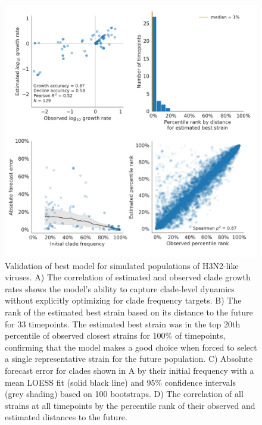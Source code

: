 \begin{figure}[H]
  \begin{center}
  \includegraphics[width=\textwidth]{figures/validation-of-best-model-for-simulated-populations.png}
  \caption{
  Validation of best model for simulated populations of H3N2-like viruses.
  A) The correlation of estimated and observed clade growth rates shows the model's ability to capture clade-level dynamics without explicitly optimizing for clade frequency targets.
  B) The rank of the estimated best strain based on its distance to the future for 33 timepoints.
  The estimated best strain was in the top 20th percentile of observed closest strains for 100\% of timepoints, confirming that the model makes a good choice when forced to select a single representative strain for the future population.
  C) Absolute forecast error for clades shown in A by their initial frequency with a mean LOESS fit (solid black line) and 95\% confidence intervals (grey shading) based on 100 bootstraps.
  D) The correlation of all strains at all timepoints by the percentile rank of their observed and estimated distances to the future.
  }
  \label{sup_fig:validation_of_best_model_for_simulated_populations}
  \end{center}
\end{figure}

